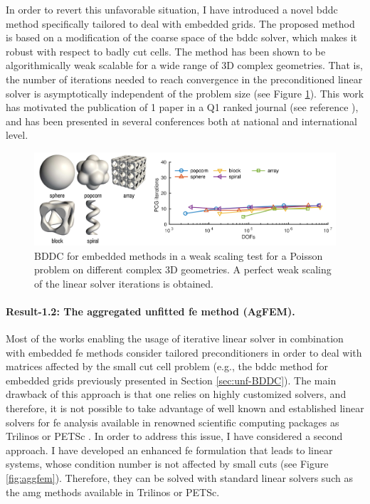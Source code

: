 \documentclass{article}
\newcommand{\bemph}[1]{#1}
\begin{document}
In order to revert this unfavorable situation, {{I have introduced a novel \ac{bddc} method  specifically tailored to deal with embedded grids}}. The proposed method is based on a modification of the coarse space of the \ac{bddc} solver,  which makes it robust with respect to badly cut cells. The method has been shown to be algorithmically weak scalable for a wide range of 3D complex geometries. That is, the number of iterations needed to reach convergence in the preconditioned linear solver is asymptotically independent of the problem size (see Figure \ref{fig:fitted-vs-unfitted-bddc}). This work has motivated the {{publication of 1 paper in a Q1 ranked journal}} (see reference \cite{badia_robust_2017}), and has been presented in several conferences both at national and international level.

\begin{figure}[ht!]
\includegraphics[width=\textwidth]{../_assets/fig2.png}
\caption{BDDC for embedded methods in a weak scaling test for a Poisson problem on different complex  3D geometries. A perfect weak scaling of the linear solver iterations is obtained.}
\label{fig:fitted-vs-unfitted-bddc}
\end{figure}

\paragraph{Result-1.2: The aggregated unfitted \ac{fe} method (AgFEM).}

Most of the works enabling the usage of iterative linear solver in combination with embedded \ac{fe} methods consider tailored preconditioners in order to deal with matrices affected by the small cut cell problem (e.g., the \ac{bddc} method for embedded grids previously presented in Section \ref{sec:unf-BDDC}). The main drawback of this approach is that one relies on highly customized solvers, and therefore, it is not possible to take advantage of well known and established linear solvers for \ac{fe} analysis available in renowned scientific computing packages as Trilinos \cite{Heroux2005} or PETSc \cite{petsc-user-ref}. In order to address this issue, I have considered a second approach. \bemph{I have developed an enhanced \ac{fe} formulation that leads to linear systems, whose condition number is not affected by small cuts} (see Figure \ref{fig:aggfem}). Therefore, they can be solved with standard linear solvers such as the \ac{amg} \cite{Baker2011} methods available in Trilinos or PETSc.
\end{document}

